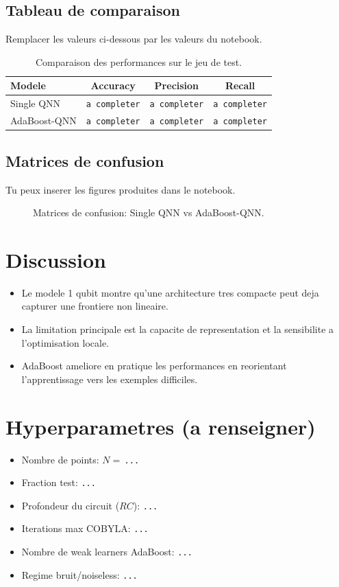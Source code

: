 \documentclass[11pt,a4paper]{article}
\begin{document}
\subsection{Tableau de comparaison}
Remplacer les valeurs ci-dessous par les valeurs du notebook.

\begin{table}[H]
\centering
\begin{tabular}{lccc}
\toprule
Modele & Accuracy & Precision & Recall \\
\midrule
Single QNN & \texttt{a completer} & \texttt{a completer} & \texttt{a completer} \\
AdaBoost-QNN & \texttt{a completer} & \texttt{a completer} & \texttt{a completer} \\
\bottomrule
\end{tabular}
\caption{Comparaison des performances sur le jeu de test.}
\end{table}

\subsection{Matrices de confusion}
Tu peux inserer les figures produites dans le notebook.

\begin{figure}[H]
  \centering
  \caption{Matrices de confusion: Single QNN vs AdaBoost-QNN.}
\end{figure}

\section{Discussion}
\begin{itemize}
  \item Le modele 1 qubit montre qu'une architecture tres compacte peut deja capturer une frontiere non lineaire.
  \item La limitation principale est la capacite de representation et la sensibilite a l'optimisation locale.
  \item AdaBoost ameliore en pratique les performances en reorientant l'apprentissage vers les exemples difficiles.
\end{itemize}


\appendix
\section{Hyperparametres (a renseigner)}
\begin{itemize}
  \item Nombre de points: $N=\,$\texttt{...}
  \item Fraction test: \texttt{...}
  \item Profondeur du circuit ($RC$): \texttt{...}
  \item Iterations max COBYLA: \texttt{...}
  \item Nombre de weak learners AdaBoost: \texttt{...}
  \item Regime bruit/noiseless: \texttt{...}
\end{itemize}
\end{document}
